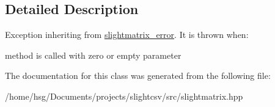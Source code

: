 \subsection{Detailed Description}
Exception inheriting from \hyperlink{classutils_1_1slightmatrix__error}{slightmatrix\+\_\+error}. It is thrown when\+:
\begin{DoxyItemize}
\item method is called with zero or empty parameter 
\end{DoxyItemize}

The documentation for this class was generated from the following file\+:\begin{DoxyCompactItemize}
\item 
/home/hsg/\+Documents/projects/slightcsv/src/slightmatrix.\+hpp\end{DoxyCompactItemize}
